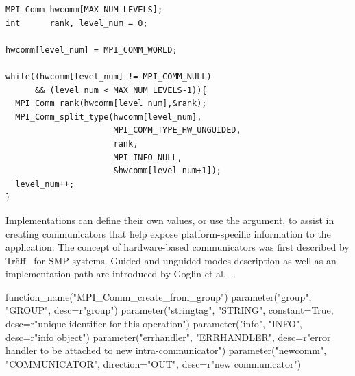 \begin{description}
\begin{example}
\begin{lstlisting}[language={[MPI]C}]
MPI_Comm hwcomm[MAX_NUM_LEVELS];
int      rank, level_num = 0;

hwcomm[level_num] = MPI_COMM_WORLD;

while((hwcomm[level_num] != MPI_COMM_NULL) 
      && (level_num < MAX_NUM_LEVELS-1)){
  MPI_Comm_rank(hwcomm[level_num],&rank);
  MPI_Comm_split_type(hwcomm[level_num],
                      MPI_COMM_TYPE_HW_UNGUIDED,
                      rank,
                      MPI_INFO_NULL,
                      &hwcomm[level_num+1]);
  level_num++;
}
\end{lstlisting}
  \end{example}
 
\end{description}

\begin{implementors}
  Implementations can define their own  values, or use the  argument, to
  assist in creating communicators that help expose platform-specific information to the application.
  The concept of hardware-based communicators was first described by Tr{\"a}ff~\cite{Traff03:archaware} for SMP systems.
  Guided and unguided modes description as well as an implementation path are introduced by
  Goglin et al.~\cite{hsplit18}.
\end{implementors}

\begin{mpi-binding}
    function_name("MPI_Comm_create_from_group")
    parameter("group", "GROUP", desc=r"group")
    parameter("stringtag", "STRING", constant=True, desc=r"unique identifier for this operation")
    parameter("info", "INFO", desc=r"info object")
    parameter("errhandler", "ERRHANDLER", desc=r"error handler to be attached to new intra-communicator")
    parameter("newcomm", "COMMUNICATOR", direction="OUT", desc=r"new communicator")
\end{mpi-binding}

